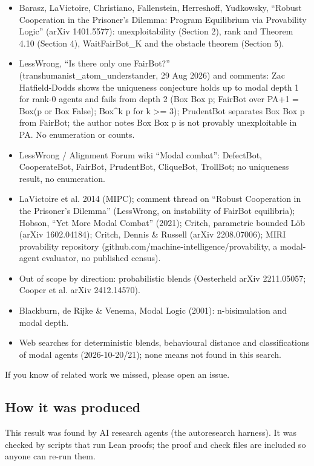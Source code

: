 \documentclass{article}
\begin{document}
\begin{itemize}
\item Barasz, LaVictoire, Christiano, Fallenstein, Herreshoff, Yudkowsky, ``Robust Cooperation in the Prisoner's Dilemma: Program Equilibrium via Provability Logic'' (arXiv 1401.5577): unexploitability (Section 2), rank and Theorem 4.10 (Section 4), WaitFairBot\_K and the obstacle theorem (Section 5).
\item LessWrong, ``Is there only one FairBot?'' (transhumanist\_atom\_understander, 29 Aug 2026) and comments: Zac Hatfield-Dodds shows the uniqueness conjecture holds up to modal depth 1 for rank-0 agents and fails from depth 2 (Box Box p; FairBot over PA+1 = Box(p or Box False); Box\textasciicircum{}k p for k \textgreater{}= 3); PrudentBot separates Box Box p from FairBot; the author notes Box Box p is not provably unexploitable in PA. No enumeration or counts.
\item LessWrong / Alignment Forum wiki ``Modal combat'': DefectBot, CooperateBot, FairBot, PrudentBot, CliqueBot, TrollBot; no uniqueness result, no enumeration.
\item LaVictoire et al. 2014 (MIPC); comment thread on ``Robust Cooperation in the Prisoner's Dilemma'' (LessWrong, on instability of FairBot equilibria); Hobson, ``Yet More Modal Combat'' (2021); Critch, parametric bounded Löb (arXiv 1602.04184); Critch, Dennis \& Russell (arXiv 2208.07006); MIRI provability repository (github.com/machine-intelligence/provability, a modal-agent evaluator, no published census).
\item Out of scope by direction: probabilistic blends (Oesterheld arXiv 2211.05057; Cooper et al. arXiv 2412.14570).
\item Blackburn, de Rijke \& Venema, Modal Logic (2001): n-bisimulation and modal depth.
\item Web searches for deterministic blends, behavioural distance and classifications of modal agents (2026-10-20/21); none means not found in this search.
\end{itemize}

If you know of related work we missed, please open an issue.

\subsection*{How it was produced}

This result was found by AI research agents (the autoresearch harness). It was checked by scripts that run Lean proofs; the proof and check files are included so anyone can re-run them.
\end{document}
